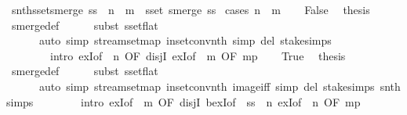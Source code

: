 \begin{isabellebody}
\endisatagproof
{\isafoldproof}%
%
\isadelimproof
\isanewline
%
\endisadelimproof
\isanewline
{}\isamarkupfalse%
\ snth{\isacharunderscore}sset{\isacharunderscore}smerge{\isacharcolon}\ {\isachardoublequoteopen}ss\ {\isacharbang}{\isacharbang}\ n\ {\isacharbang}{\isacharbang}\ m\ {\isasymin}\ sset\ {\isacharparenleft}smerge\ ss{\isacharparenright}{\isachardoublequoteclose}\isanewline
%
\isadelimproof
%
\endisadelimproof
%
\isatagproof
{}\isamarkupfalse%
\ {\isacharparenleft}cases\ {\isachardoublequoteopen}n\ {\isasymle}\ m{\isachardoublequoteclose}{\isacharparenright}\isanewline
\ \ \isamarkupfalse%
\ False\ \isamarkupfalse%
\ {\isacharquery}thesis\ \isamarkupfalse%
\ smerge{\isacharunderscore}def\isanewline
\ \ \ \ \isamarkupfalse%
\ {\isacharparenleft}subst\ sset{\isacharunderscore}flat{\isacharparenright}\isanewline
\ \ \ \ \ \ {\isacharparenleft}auto\ simp{\isacharcolon}\ stream{\isachardot}set{\isacharunderscore}map\ in{\isacharunderscore}set{\isacharunderscore}conv{\isacharunderscore}nth\ simp\ del{\isacharcolon}\ stake{\isachardot}simps\isanewline
\ \ \ \ \ \ \ \ intro{\isacharbang}{\isacharcolon}\ exI{\isacharbrackleft}of\ {\isacharunderscore}\ n{\isacharcomma}\ OF\ disjI{}{\isacharbrackright}\ exI{\isacharbrackleft}of\ {\isacharunderscore}\ m{\isacharcomma}\ OF\ mp{\isacharbrackright}{\isacharparenright}\isanewline
{}\isamarkupfalse%
\isanewline
\ \ \isamarkupfalse%
\ True\ \isamarkupfalse%
\ {\isacharquery}thesis\ \isamarkupfalse%
\ smerge{\isacharunderscore}def\isanewline
\ \ \ \ \isamarkupfalse%
\ {\isacharparenleft}subst\ sset{\isacharunderscore}flat{\isacharparenright}\isanewline
\ \ \ \ \ \ {\isacharparenleft}auto\ simp{\isacharcolon}\ stream{\isachardot}set{\isacharunderscore}map\ in{\isacharunderscore}set{\isacharunderscore}conv{\isacharunderscore}nth\ image{\isacharunderscore}iff\ simp\ del{\isacharcolon}\ stake{\isachardot}simps\ snth{\isachardot}simps\isanewline
\ \ \ \ \ \ \ \ intro{\isacharbang}{\isacharcolon}\ exI{\isacharbrackleft}of\ {\isacharunderscore}\ m{\isacharcomma}\ OF\ disjI{}{\isacharbrackright}\ bexI{\isacharbrackleft}of\ {\isacharunderscore}\ {\isachardoublequoteopen}ss\ {\isacharbang}{\isacharbang}\ n{\isachardoublequoteclose}{\isacharbrackright}\ exI{\isacharbrackleft}of\ {\isacharunderscore}\ n{\isacharcomma}\ OF\ mp{\isacharbrackright}{\isacharparenright}\isanewline
{}\isamarkupfalse%
%
\endisatagproof

\end{isabellebody}

